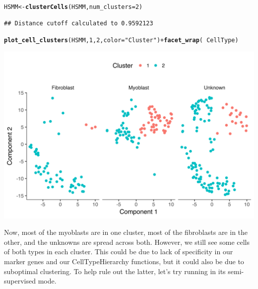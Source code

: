 \documentclass[10pt,oneside]{article}\usepackage[]{graphicx}\usepackage[]{color}
\makeatletter
\def\maxwidth{ %
  \ifdim\Gin@nat@width>\linewidth
    \linewidth
  \else
    \Gin@nat@width
  \fi
}
\newcommand{\hlnum}[1]{\textcolor[rgb]{0.686,0.059,0.569}{#1}}%
\newcommand{\hlstr}[1]{\textcolor[rgb]{0.192,0.494,0.8}{#1}}%
\newcommand{\hlopt}[1]{\textcolor[rgb]{0,0,0}{#1}}%
\newcommand{\hlstd}[1]{\textcolor[rgb]{0.345,0.345,0.345}{#1}}%
\newcommand{\hlkwb}[1]{\textcolor[rgb]{0.69,0.353,0.396}{#1}}%
\newcommand{\hlkwc}[1]{\textcolor[rgb]{0.333,0.667,0.333}{#1}}%
\newcommand{\hlkwd}[1]{\textcolor[rgb]{0.737,0.353,0.396}{\textbf{#1}}}%
\newenvironment{kframe}{%
 \def\at@end@of@kframe{}%
 \ifinner\ifhmode%
  \def\at@end@of@kframe{\end{minipage}}%
  \begin{minipage}{\columnwidth}%
 \fi\fi%
 \def\FrameCommand##1{\hskip\@totalleftmargin \hskip-\fboxsep
 \colorbox{shadecolor}{##1}\hskip-\fboxsep
     \hskip-\linewidth \hskip-\@totalleftmargin \hskip\columnwidth}%
 \MakeFramed {\advance\hsize-\width
   \@totalleftmargin\z@ \linewidth\hsize
   \@setminipage}}%
 {\par\unskip\endMakeFramed%
 \at@end@of@kframe}
\newenvironment{knitrout}{}{} %
\makeatother
\begin{document}
\begin{knitrout}
\color{fgcolor}\begin{kframe}
\begin{alltt}
\hlstd{HSMM} \hlkwb{<-} \hlkwd{clusterCells}\hlstd{(HSMM,} \hlkwc{num_clusters}\hlstd{=}\hlnum{2}\hlstd{)}
\end{alltt}
\begin{verbatim}
## Distance cutoff calculated to 0.9592123
\end{verbatim}


{\ttfamily\noindent\itshape\color{messagecolor}{\#\# the length of the distance: 34191}}\begin{alltt}
\hlkwd{plot_cell_clusters}\hlstd{(HSMM,} \hlnum{1}\hlstd{,} \hlnum{2}\hlstd{,} \hlkwc{color}\hlstd{=}\hlstr{"Cluster"}\hlstd{)} \hlopt{+} \hlkwd{facet_wrap}\hlstd{(}\hlopt{~}\hlstd{CellType)}
\end{alltt}
\end{kframe}

{\centering \includegraphics[width=\maxwidth]{figure/cluster_cells_unsup_plot_by_cell_type-1} 

}



\end{knitrout}
 
Now, most of the myoblasts are in one cluster, most of the fibroblasts are in the other, and the unknowns are spread across both. However, we still see some cells of both types in each cluster. This could be due to lack of specificity in our marker genes and our CellTypeHierarchy functions, but it could also be due to suboptimal clustering. To help rule out the latter, let's try running  in its semi-supervised mode.  
  
\end{document}
